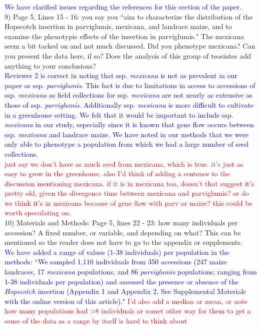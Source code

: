 \documentclass[11pt]{article}
\newcommand{\res}[1]{\noindent \textcolor{blue}{{#1}} \\}
\newcommand{\jri}[1]{\noindent \textcolor{red}{{#1}} \\}
\begin{document}
\res{We have clarified issues regarding the references for this section of the paper.}

9) Page 5, Lines 15 - 16: you say you ``aim to characterize the distribution of the Hopscotch insertion in parviglumis, mexicana, and landrace maize, and to examine the phenotypic eﬀects of the insertion in parviglumis."  The mexicana seem a bit tacked on and not much discussed. Did you phenotype mexicana? Can you present the data here, if so? Does the analysis of this group of teosintes add anything to your conclusions?\\

\res{Reviewer 2 is correct in noting that ssp. \emph{mexicana} is not as prevalent in our paper as ssp. \emph{parviglumis}. This fact is due to limitations in access to accessions of ssp. \emph{mexicana} as field collections for ssp. \emph{mexicana} are not nearly as extensive as those of ssp. \emph{parviglumis}. Additionally ssp. \emph{mexicana} is more difficult to cultivate in a greenhouse setting. We felt that it would be important to include ssp. \emph{mexicana} in our study, especially since it is known that gene flow occurs between ssp. \emph{mexicana} and landrace maize. We have noted in our methods that we were only able to phenotype a population from which we had a large number of seed collections.} \jri{just say we don't have as much seed from mexicana, which is true. it's just as easy to grow in the greenhouse. also I'd think of adding a sentence to the discussion mentioning mexicana. if it is in mexicana too, doesn't that suggest it's pretty old, given the divergence time between mexicana and parviglumis? or do we think it's in mexicana because of gene flow with parv or maize? this could be worth speculating on.}

10) Materials and Methods:
Page 5, lines 22 - 23: how many individuals per accession? A fixed number, or variable, and depending on what? This can be mentioned so the reader does not have to go to the appendix or supplements.\\ 

\res{We have added a range of values (1-38 individuals) per population in the methods: ``We sampled 1,110 individuals from 350 accessions (247 maize landraces, 17 \emph{mexicana} populations, and 86 \emph{parviglumis} populations; ranging from 1-38 individuals per population) and assessed the presence or absence of the \emph{Hopscotch} insertion (Appendix 1 and Appendix 2, See Supplemental Materials with the online version of this article)." \jri{I'd also add a median or mean, or note how many populations had >8 individuals or somet other way for them to get a sense of the data as a range by itself is hard to think about}}
\end{document}
